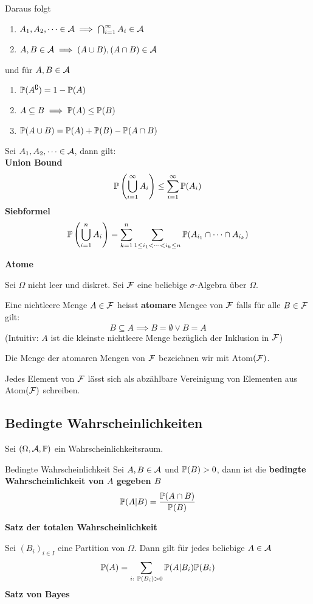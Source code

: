 Daraus folgt
\begin{enumerate}[label=\arabic*.]
    \item $A_1,A_2, \dots \in \A \implies \bigcap_{i=1}^{\infty}A_i \in \A$
    \item $A,B \in \A \implies (A \cup B), (A \cap B) \in \A$
\end{enumerate}
und für $A, B \in \A$
\begin{enumerate}[label=\arabic*.]
    \item $\P(A^\complement) = 1 - \P(A)$
    \item $A \subseteq B \implies \P(A) \leq \P(B)$
    \item $\P(A \cup B) = \P(A)+\P(B)-\P(A \cap B)$
\end{enumerate}
Sei $A_1,A_2, \dots \in \A$, dann gilt:\\
\textbf{Union Bound}
    $$\P\left(\bigcup_{i=1}^{\infty} A_i \right) \leq \sum_{i=1}^{\infty}\P(A_i)$$
\textbf{Siebformel}
    $$\P\left(\bigcup_{i=1}^{n}A_i\right) = \sum_{k = 1}^{n}\sum_{1\leq i_1 < \dots < i_k \leq n} \P(A_{i_1} \cap \dots \cap A_{i_k})$$

    \textbf{Atome}

        Sei $\Omega$ nicht leer und diskret. Sei $\F$ eine beliebige $\sigma$-Algebra über $\Omega$. 
    
        Eine nichtleere Menge $A \in \F$ heisst \textbf{atomare} Mengee von $\F$ falls für alle $B \in \F$ gilt:
        $$B \subseteq A \implies B = \emptyset \lor B = A$$
        (Intuitiv: $A$ ist die kleinste nichtleere Menge bezüglich der Inklusion in $\F$)
    
        Die Menge der atomaren Mengen von $\F$ bezeichnen wir mit Atom$(\F)$.
    
        Jedes Element von $\F$ lässt sich als abzählbare Vereinigung von Elementen aus Atom$(\F)$ schreiben.
    
\subsection{Bedingte Wahrscheinlichkeiten}
 Sei $(\Omega, \A, \P)$ ein Wahrscheinlichkeitsraum.
 \begin{mainbox}{Bedingte Wahrscheinlichkeit}
    Sei $A, B \in \A$ und $\P(B) > 0$, dann ist die \textbf{bedingte Wahrscheinlichkeit von $A$ gegeben $B$}
    $$\P(A|B) = \frac{\P(A \cap B)}{\P(B)}$$
 \end{mainbox}
\textbf{Satz der totalen Wahrscheinlichkeit}

Sei $(B_i)_{i\in I}$ eine Partition von $\Omega$. Dann gilt für jedes beliebige $A \in \A$
$$\P(A) = \sum_{i:\ \P(B_i)>0} \P(A|B_i)\P(B_i)$$
\textbf{Satz von Bayes}

